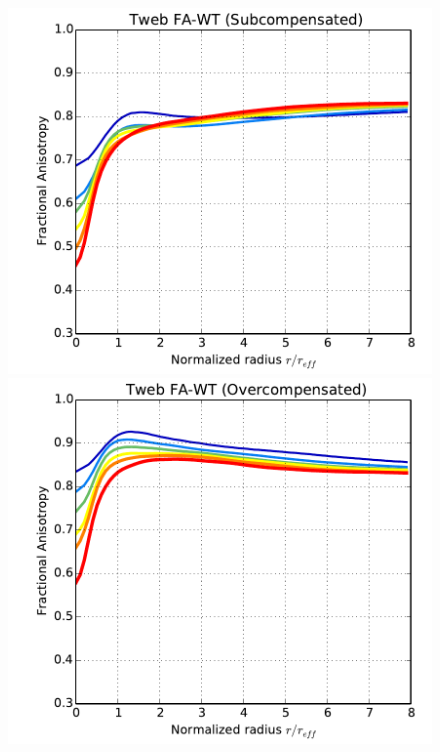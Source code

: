 \documentclass[a4,useAMS,usenatbib,usegraphicx]{mn2e}
\begin{document}
\begin{figure}
\centering  
  \includegraphics[trim = 2mm 2mm 5mm 0mm, clip, keepaspectratio=true,
  width=0.35\textheight]{voids_FA_TwebFAG0.pdf}
  \includegraphics[trim = 2mm 2mm 5mm 0mm, clip, keepaspectratio=true,
  width=0.35\textheight]{voids_FA_TwebFAG1.pdf}

\end{figure}
\end{document}
